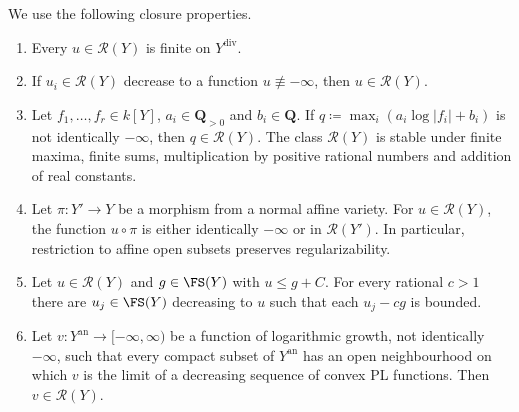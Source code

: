 \documentclass[11pt,a4paper]{article}
\newcommand{\an}{\mathrm{an}}          %
\newcommand{\divv}{\mathrm{div}}       %
\begin{document}
We use the following closure properties.

\begin{lemma}\label{lem:regularizable-closure}
\begin{enumerate}
\item Every $u\in\mathcal{R}(Y)$ is finite on $Y^{\divv}$.
\item If $u_i\in\mathcal{R}(Y)$ decrease to a function $u\not\equiv-\infty$, then $u\in\mathcal{R}(Y)$.
\item Let $f_1,\ldots,f_r\in k[Y]$, $a_i\in\mathbf Q_{>0}$ and $b_i\in\mathbf Q$. If $q\coloneqq\max_i(a_i\log|f_i|+b_i)$ is not identically $-\infty$, then $q\in\mathcal{R}(Y)$. The class $\mathcal{R}(Y)$ is stable under finite maxima, finite sums, multiplication by positive rational numbers and addition of real constants.
\item Let $\pi\colon Y'\to Y$ be a morphism from a normal affine variety. For $u\in\mathcal{R}(Y)$, the function $u\circ\pi$ is either identically $-\infty$ or in $\mathcal{R}(Y')$. In particular, restriction to affine open subsets preserves regularizability.
\item Let $u\in\mathcal{R}(Y)$ and $g\in\FS(Y)$ with $u\le g+C$. For every rational $c>1$ there are $u_j\in\FS(Y)$ decreasing to $u$ such that each $u_j-cg$ is bounded.
\item Let $v\colon Y^{\an}\to[-\infty,\infty)$ be a function of logarithmic growth, not identically $-\infty$, such that every compact subset of $Y^{\an}$ has an open neighbourhood on which $v$ is the limit of a decreasing sequence of convex PL functions. Then $v\in\mathcal{R}(Y)$.
\end{enumerate}
\end{lemma}
\end{document}
